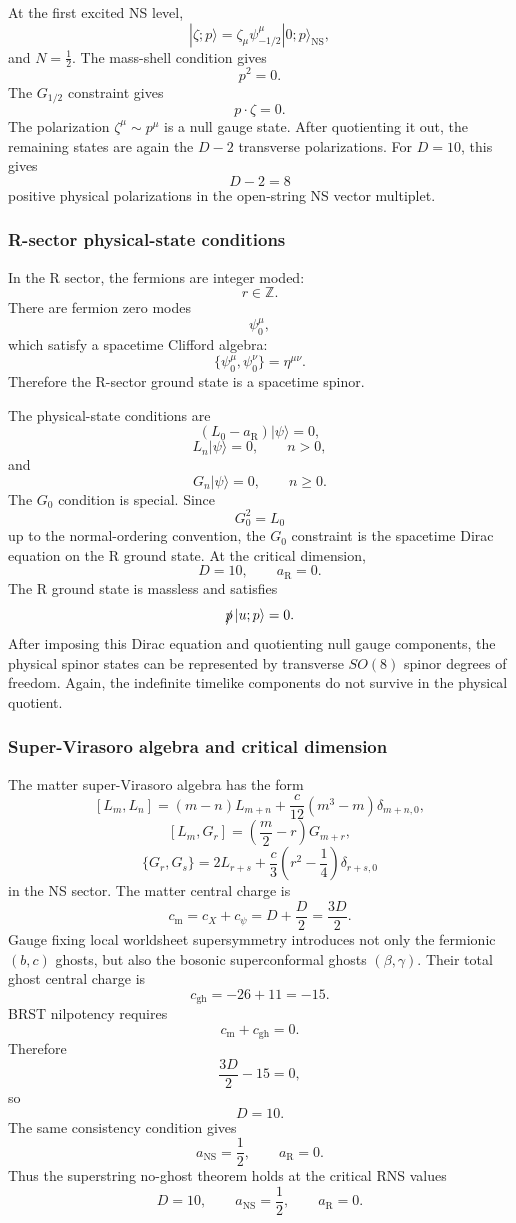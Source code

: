 \documentclass[
  10pt,
  a4paper,
  openany]{book}
\begin{document}
At the first excited NS level, \[
|\zeta;p\rangle
=
\zeta_\mu\psi_{-1/2}^\mu|0;p\rangle_{\text{NS}},
\] and \(N=\frac{1}{2}\). The mass-shell condition gives \[
p^2=0.
\] The \(G_{1/2}\) constraint gives \[
p\cdot\zeta=0.
\] The polarization \(\zeta^\mu\sim p^\mu\) is a null gauge state. After
quotienting it out, the remaining states are again the \(D-2\)
transverse polarizations. For \(D=10\), this gives \[
D-2=8
\] positive physical polarizations in the open-string NS vector
multiplet.

\subsubsection{R-sector physical-state
conditions}\label{r-sector-physical-state-conditions}

In the R sector, the fermions are integer moded: \[
r\in\mathbb Z.
\] There are fermion zero modes \[
\psi_0^\mu,
\] which satisfy a spacetime Clifford algebra: \[
\{\psi_0^\mu,\psi_0^\nu\}
=
\eta^{\mu\nu}.
\] Therefore the R-sector ground state is a spacetime spinor.

The physical-state conditions are \[
(L_0-a_{\text{R}})|\psi\rangle=0,
\] \[
L_n|\psi\rangle=0,
\qquad
n>0,
\] and \[
G_n|\psi\rangle=0,
\qquad
n\geq 0.
\] The \(G_0\) condition is special. Since \[
G_0^2=L_0
\] up to the normal-ordering convention, the \(G_0\) constraint is the
spacetime Dirac equation on the R ground state. At the critical
dimension, \[
D=10,
\qquad
a_{\text{R}}=0.
\] The R ground state is massless and satisfies \[
\slashed p\,|u;p\rangle=0.
\] After imposing this Dirac equation and quotienting null gauge
components, the physical spinor states can be represented by transverse
\(SO(8)\) spinor degrees of freedom. Again, the indefinite timelike
components do not survive in the physical quotient.

\subsubsection{Super-Virasoro algebra and critical
dimension}\label{super-virasoro-algebra-and-critical-dimension}

The matter super-Virasoro algebra has the form \[
[L_m,L_n]
=
(m-n)L_{m+n}
+
\frac{c}{12}(m^3-m)\delta_{m+n,0},
\] \[
[L_m,G_r]
=
\left(\frac{m}{2}-r\right)G_{m+r},
\] \[
\{G_r,G_s\}
=
2L_{r+s}
+
\frac{c}{3}\left(r^2-\frac{1}{4}\right)\delta_{r+s,0}
\] in the NS sector. The matter central charge is \[
c_{\text{m}}
=
c_X+c_\psi
=
D+\frac{D}{2}
=
\frac{3D}{2}.
\] Gauge fixing local worldsheet supersymmetry introduces not only the
fermionic \((b,c)\) ghosts, but also the bosonic superconformal ghosts
\((\beta,\gamma)\). Their total ghost central charge is \[
c_{\text{gh}}
=
-26+11
=
-15.
\] BRST nilpotency requires \[
c_{\text{m}}+c_{\text{gh}}=0.
\] Therefore \[
\frac{3D}{2}-15=0,
\] so \[
D=10.
\] The same consistency condition gives \[
a_{\text{NS}}=\frac{1}{2},
\qquad
a_{\text{R}}=0.
\] Thus the superstring no-ghost theorem holds at the critical RNS
values \[
D=10,
\qquad
a_{\text{NS}}=\frac{1}{2},
\qquad
a_{\text{R}}=0.
\]
\end{document}
